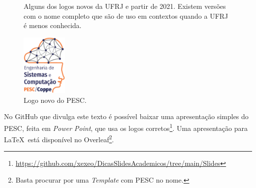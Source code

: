 \begin{figure}[hbt]
    \centering
    \caption{Alguns dos logos novos da  UFRJ e partir de 2021. Existem versões com o nome completo que são de uso em contextos quando a UFRJ é menos conhecida.}
    \label{fig:logoufrj}
\end{figure}

\begin{figure}[hbt]
    \centering
    \includegraphics[height=3cm]{imagens/logoPrincipal.eps}
    \caption{Logo novo do PESC.}
    \label{fig:logopesc}
\end{figure}



No GitHub que divulga este texto é possível baixar uma apresentação simples do PESC, feita em \textit{Power Point}, que usa os logos corretos\footnote{\url{https://github.com/xexeo/DicasSlidesAcademicos/tree/main/Slides}}. Uma apresentação para \LaTeX\  está disponível no Overleaf\footnote{Basta procurar por uma \textit{Template} com PESC no nome.}.



